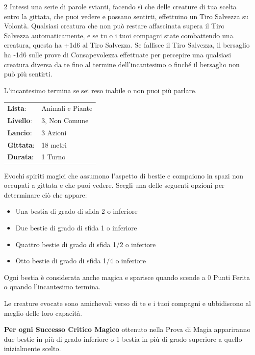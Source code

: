 \begin{multicols}{2}
Intessi una serie di parole svianti, facendo sì che delle creature di tua scelta entro la gittata, che puoi vedere e possano sentirti, effettuino un Tiro Salvezza su Volontà. Qualsiasi creatura che non può restare affascinata supera il Tiro Salvezza automaticamente, e se tu o i tuoi compagni state combattendo una creatura, questa ha +1d6 al Tiro Salvezza. Se fallisce il Tiro Salvezza, il bersaglio ha -1d6 sulle prove di Consapevolezza effettuate per percepire una qualsiasi creatura diversa da te fino al termine dell'incantesimo o finché il bersaglio non può più sentirti.

L'incantesimo termina se sei reso inabile o non puoi più parlare.

\noindent\begin{tabularx}{\linewidth}{p{1.9cm}X}
	\rowcolor{gray!20}\textbf{Lista}: & Animali e Piante \\
	\textbf{Livello}: & 3, Non Comune \\
	\rowcolor{gray!20}\textbf{Lancio}: & 3 Azioni \\
	\textbf{Gittata}: & 18 metri \\
	\rowcolor{gray!20}\textbf{Durata}: & 1 Turno \\
\end{tabularx}\smallskip

Evochi spiriti magici che assumono l'aspetto di bestie e compaiono in spazi non occupati a gittata e che puoi vedere. Scegli una delle seguenti opzioni per determinare ciò che appare:

\begin{itemize}[leftmargin=*] \setlength{\itemsep}{-1pt}
	\item Una bestia di grado di sfida 2 o inferiore
	\item Due bestie di grado di sfida 1 o inferiore
	\item Quattro bestie di grado di sfida 1/2 o inferiore
	\item Otto bestie di grado di sfida 1/4 o inferiore
\end{itemize}

Ogni bestia è considerata anche magica e sparisce quando scende a 0 Punti Ferita o quando l'incantesimo termina.

Le creature evocate sono amichevoli verso di te e i tuoi compagni e ubbidiscono al meglio delle loro capacità.

\textbf{Per ogni Successo Critico Magico} ottenuto nella Prova di Magia appariranno due bestie in più di grado inferiore o 1 bestia in più di grado superiore a quello inizialmente scelto.


\end{multicols}
